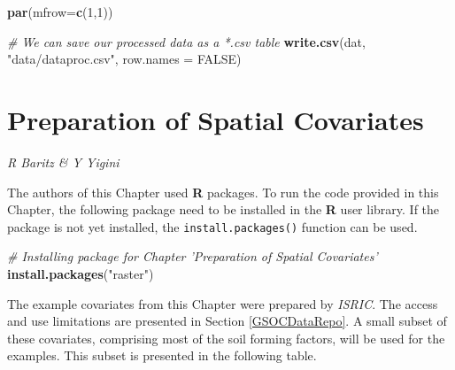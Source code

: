 \documentclass[10pt,b5paper,]{book}
\newenvironment{Shaded}{\begin{snugshade}}{\end{snugshade}}
\newcommand{\CommentTok}[1]{\textcolor[rgb]{0.56,0.35,0.01}{\textit{#1}}}
\newcommand{\DataTypeTok}[1]{\textcolor[rgb]{0.13,0.29,0.53}{#1}}
\newcommand{\DecValTok}[1]{\textcolor[rgb]{0.00,0.00,0.81}{#1}}
\newcommand{\KeywordTok}[1]{\textcolor[rgb]{0.13,0.29,0.53}{\textbf{#1}}}
\newcommand{\NormalTok}[1]{#1}
\newcommand{\OtherTok}[1]{\textcolor[rgb]{0.56,0.35,0.01}{#1}}
\newcommand{\StringTok}[1]{\textcolor[rgb]{0.31,0.60,0.02}{#1}}
\theoremstyle{definition}
\theoremstyle{definition}
\theoremstyle{definition}
\theoremstyle{remark}
\begin{document}
\begin{Shaded}
\begin{Highlighting}[]
\KeywordTok{par}\NormalTok{(}\DataTypeTok{mfrow=}\KeywordTok{c}\NormalTok{(}\DecValTok{1}\NormalTok{,}\DecValTok{1}\NormalTok{))}

\CommentTok{# We can save our processed data as a *.csv table}
\KeywordTok{write.csv}\NormalTok{(dat, }\StringTok{"data/dataproc.csv"}\NormalTok{, }\DataTypeTok{row.names =} \OtherTok{FALSE}\NormalTok{)}
\end{Highlighting}
\end{Shaded}

\hypertarget{covariates}{%
\chapter{Preparation of Spatial Covariates}\label{covariates}}

\emph{R Baritz \& Y Yigini}

The authors of this Chapter used \textbf{R} packages. To run the code
provided in this Chapter, the following package need to be installed in
the \textbf{R} user library. If the package is not yet installed, the
\texttt{install.packages()} function can be used.

\begin{Shaded}
\begin{Highlighting}[]
\CommentTok{# Installing package for Chapter 'Preparation of Spatial Covariates'}
\KeywordTok{install.packages}\NormalTok{(}\StringTok{"raster"}\NormalTok{)}
\end{Highlighting}
\end{Shaded}

The example covariates from this Chapter were prepared by \emph{ISRIC}.
The access and use limitations are presented in Section
\ref{GSOCDataRepo}. A small subset of these covariates, comprising most
of the soil forming factors, will be used for the examples. This subset
is presented in the following table.
\end{document}
